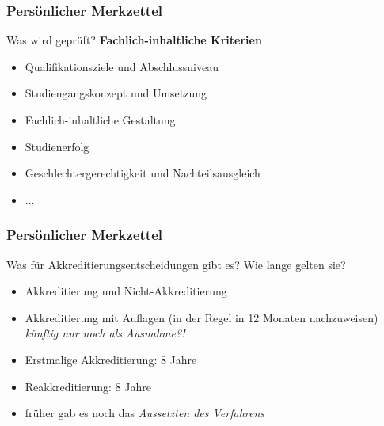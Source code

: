 \documentclass{beamer}
\begin{document}
\begin{frame}
\frametitle{Persönlicher Merkzettel}
Was wird geprüft?
\vspace{0.5cm}
\textbf{Fachlich-inhaltliche Kriterien}
\begin{itemize}
\item Qualifikationsziele und Abschlussniveau
\item Studiengangskonzept und Umsetzung
\item Fachlich-inhaltliche Gestaltung
\item Studienerfolg
\item Geschlechtergerechtigkeit und Nachteilsausgleich
\item ...
\end{itemize}
\end{frame}
\begin{frame}
\frametitle{Persönlicher Merkzettel}
Was für Akkreditierungsentscheidungen gibt es? Wie lange gelten sie?
\begin{itemize}
\item Akkreditierung und Nicht-Akkreditierung
\item Akkreditierung mit Auflagen (in der Regel in 12 Monaten nachzuweisen) \emph{künftig nur noch als Ausnahme?!}
\item Erstmalige Akkreditierung: 8 Jahre
\item Reakkreditierung: 8 Jahre
\item früher gab es noch das \emph{Aussetzten des Verfahrens}
\end{itemize}
\end{frame}
\end{document}
